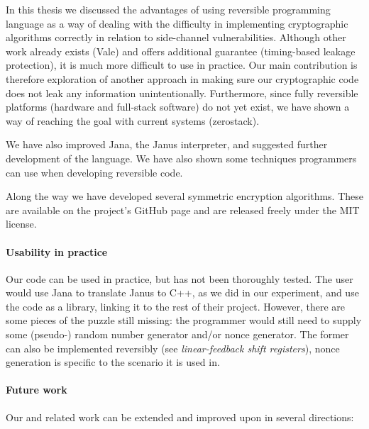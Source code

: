 \documentclass[a4paper,10pt,openright]{memoir}
\newcommand{\term}[1]{\textit{#1}}
\begin{document}
In this thesis we discussed the advantages of using reversible 
programming language as a way of dealing with the difficulty in 
implementing cryptographic algorithms correctly in relation to 
side-channel vulnerabilities. Although other work already exists (Vale) 
and offers additional guarantee (timing-based leakage protection), it 
is much more difficult to use in practice. Our main contribution is 
therefore exploration of another approach in making sure our 
cryptographic code does not leak any information unintentionally. 
Furthermore, since fully reversible platforms (hardware and full-stack 
software) do not yet exist, we have shown a way of reaching the goal 
with current systems (zerostack).

We have also improved Jana, the Janus interpreter, and suggested further 
development of the language. We have also shown some techniques 
programmers can use when developing reversible code.

Along the way we have developed several symmetric encryption 
algorithms. These are available on the project's GitHub page and are 
released freely under the MIT license.

\paragraph{Usability in practice}

Our code can be used in practice, but has not been thoroughly tested. 
The user would use Jana to translate Janus to C++, as we did in our 
experiment, and use the code as a library, linking it to the rest of 
their project. However, there are some pieces of the puzzle still 
missing: the programmer would still need to supply some (pseudo-) 
random number generator and/or nonce generator. The former can also be 
implemented reversibly (see \term{linear-feedback shift registers}), 
nonce generation is specific to the scenario it is used in.

\paragraph{Future work}

Our and related work can be extended and improved upon in several 
directions:
\end{document}
